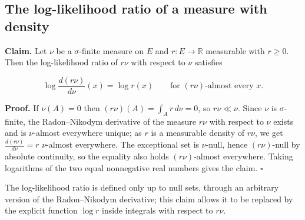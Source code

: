 \documentclass[11pt,a4paper]{report}
\begin{document}
\subsection{\texorpdfstring{The log-likelihood ratio of a measure with density}{The log-likelihood ratio of a measure with density}}
\label{report-step-UnadjustedLangevin-LSI-KLOfDensity-lean-3}


\textbf{Claim.} Let \(\nu\) be a \(\sigma\)-finite measure on \(E\) and \(r:E\to\mathbb R\) measurable with \(r\ge0\). Then the log-likelihood ratio of \(r\nu\) with respect to \(\nu\) satisfies


\[\log\frac{d(r\nu)}{d\nu}(x)=\log r(x)\qquad\text{for }(r\nu)\text{-almost every }x.\]


\textbf{Proof.} If \(\nu(A)=0\) then \((r\nu)(A)=\int_Ar\,d\nu=0\), so \(r\nu\ll\nu\). Since \(\nu\) is \(\sigma\)-finite, the Radon–Nikodym derivative of the measure \(r\nu\) with respect to \(\nu\) exists and is \(\nu\)-almost everywhere unique; as \(r\) is a measurable density of \(r\nu\), we get \(\frac{d(r\nu)}{d\nu}=r\) \(\nu\)-almost everywhere. The exceptional set is \(\nu\)-null, hence \((r\nu)\)-null by absolute continuity, so the equality also holds \((r\nu)\)-almost everywhere. Taking logarithms of the two equal nonnegative real numbers gives the claim. \(\square\)




The log-likelihood ratio is defined only up to null sets, through an arbitrary version of the Radon–Nikodym derivative; this claim allows it to be replaced by the explicit function \(\log r\) inside integrals with respect to \(r\nu\).
\end{document}
